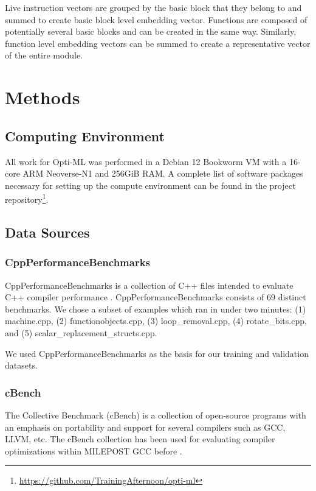\documentclass[nohyperref]{article}
\theoremstyle{plain}
\theoremstyle{definition}
\theoremstyle{remark}
\begin{document}
Live instruction vectors are grouped by the basic block that they belong to and summed to create basic block level embedding vector. Functions are composed of potentially several basic blocks and can be created in the same way. Similarly, function level embedding vectors can be summed to create a representative vector of the entire module.



\section{Methods}
\label{methods}
\subsection{Computing Environment}
All work for Opti-ML was performed in a Debian 12 Bookworm VM with a 16-core ARM Neoverse-N1 and 256GiB RAM. A complete list of software packages necessary for setting up the compute environment can be found in the project repository\footnote{\href{https://github.com/TrainingAfternoon/opti-ml}{https://github.com/TrainingAfternoon/opti-ml}}.

\subsection{Data Sources}
\subsubsection{CppPerformanceBenchmarks}
CppPerformanceBenchmarks is a collection of C++ files intended to evaluate C++ compiler performance \cite{cpp-perf-benchmarks}. CppPerformanceBenchmarks consists of 69 distinct benchmarks. We chose a subset of examples which ran in under two minutes: (1) machine.cpp, (2) functionobjects.cpp, (3) loop\_removal.cpp, (4) rotate\_bits.cpp, and (5) scalar\_replacement\_structs.cpp.

We used CppPerformanceBenchmarks as the basis for our training and validation datasets.

\subsubsection{cBench}
The Collective Benchmark (cBench) is a collection of open-source programs with an emphasis on portability and support for several compilers such as GCC, LLVM, etc. The cBench collection has been used for evaluating compiler optimizations within MILEPOST GCC before \cite{cbench}.
\end{document}
